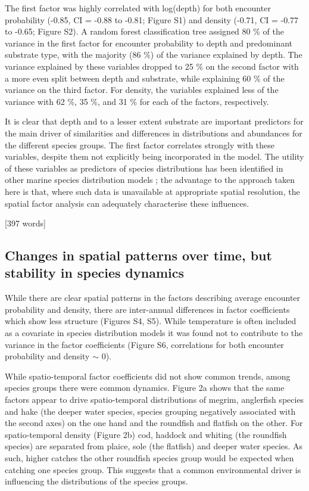 \documentclass{nature}
\begin{document}
\begin{linenumbers}
The first factor was highly correlated with log(depth) for both encounter
probability (-0.85, CI = -0.88 to -0.81; Figure S1) and density (-0.71, CI =
-0.77 to -0.65; Figure S2). A random forest classification tree assigned 80 \%
of the variance in the first factor for encounter probability to depth and
predominant substrate type, with the majority (86 \%) of the variance explained
by depth. The variance explained by these variables dropped to 25 \% on the
second factor with a more even split between depth and substrate, while
explaining 60 \% of the variance on the third factor.  For density, the
variables explained less of the variance with 62 \%, 35 \%, and 31 \% for each
of the factors, respectively.

It is clear that depth and to a lesser extent substrate are important
predictors for the main driver of similarities and differences in distributions
and abundances for the different species groups. The first factor correlates
strongly with these variables, despite them not explicitly being incorporated
in the model. The utility of these variables as predictors of species
distributions has been identified in other marine species distribution models
\cite{Robinson2011}; the advantage to the approach taken here is that, where
such data is unavailable at appropriate spatial resolution, the spatial factor
analysis can adequately characterise these influences.

[397 words]

\subsection{Changes in spatial patterns over time, but stability in species
	dynamics}

While there are clear spatial patterns in the factors describing average
encounter probability and density, there are inter-annual differences in factor
coefficients which show less structure (Figures S4, S5). While temperature is
often included as a covariate in species distribution models it was found not
to contribute to the variance in the factor coefficients (Figure S6,
correlations for both encounter probability and density $\sim$ 0).

While spatio-temporal factor coefficients did not show common trends, among
species groups there were common dynamics. Figure 2a shows that the same
factors appear to drive spatio-temporal distributions of megrim, anglerfish
species and hake (the deeper water species, species grouping negatively
associated with the second axes) on the one hand and the roundfish and flatfish
on the other. For spatio-temporal density (Figure 2b) cod, haddock and whiting
(the roundfish species) are separated from plaice, sole (the flatfish) and
deeper water species. As such, higher catches the other roundfish species group
would be expected when catching one species group. This suggests that a common
environmental driver is influencing the distributions of the species groups.  


\end{linenumbers}
\end{document}
